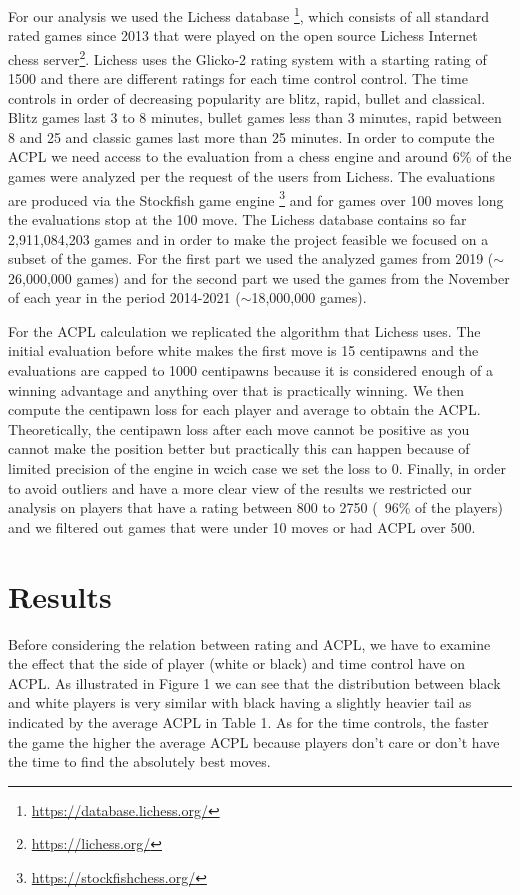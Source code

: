 \documentclass{article}
\begin{document}
For our analysis we used the Lichess database \footnote{\url{https://database.lichess.org/}}, which consists of all standard rated games since 2013 that were played on the open source Lichess Internet chess server\footnote{\url{https://lichess.org/}}. Lichess uses the Glicko-2 rating system with a starting rating of 1500 and there are different ratings for each time control control. The time controls in order of decreasing popularity are blitz, rapid, bullet and classical. Blitz games last 3 to 8 minutes, bullet games less than 3 minutes, rapid between 8 and 25 and classic games last more than 25 minutes. In order to compute the ACPL we need access to the evaluation from a chess engine and around 6\% of the games were analyzed per the request of the users from Lichess. The evaluations are produced via the Stockfish game engine \footnote{\url{https://stockfishchess.org/}} and for games over 100 moves long the evaluations stop at the 100 move. The Lichess database contains so far 2,911,084,203 games and in order to make the project feasible we focused on a subset of the games. For the first part we used the analyzed games from 2019 ($\sim$26,000,000 games) and for the second part we used the games from the November of each year in the period 2014-2021 ($\sim$18,000,000 games).

For the ACPL calculation we replicated the algorithm that Lichess uses. The initial evaluation before white makes the first move is 15 centipawns and the evaluations are capped to 1000 centipawns because it is considered enough of a winning advantage and anything over that is practically winning. We then compute the centipawn loss for each player and average to obtain the ACPL. Theoretically, the centipawn loss after each move cannot be positive as you cannot make the position better but practically this can happen because of limited precision of the engine in wcich case we set the loss to 0. 
Finally, in order to avoid outliers and have a more clear view of the results we restricted our analysis on players that have a rating between 800 to 2750 (~96\% of the players) and we filtered out games that were under 10 moves or had ACPL over 500.

\section{Results}

Before considering the relation between rating and ACPL, we have to examine the effect that the side of player (white or black) and time control have on ACPL.  As illustrated in Figure 1 we can see that the distribution between black and white players is very similar with black having a slightly heavier tail as indicated by the average ACPL in Table 1. As for the time controls, the faster the game the higher the average ACPL because players don’t care or don’t have the time to find the absolutely best moves.
\end{document}
